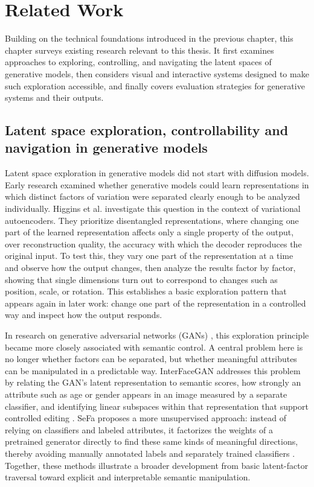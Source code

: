 \chapter{Related Work}\label{ch:related-work}

Building on the technical foundations introduced in the previous chapter, this chapter surveys existing research relevant to this thesis. It first examines approaches to exploring, controlling, and navigating the latent spaces of generative models, then considers visual and interactive systems designed to make such exploration accessible, and finally covers evaluation strategies for generative systems and their outputs.

\section{Latent space exploration, controllability and navigation in generative models}\label{sec:3.1}

Latent space exploration in generative models did not start with diffusion models. Early research examined whether generative models could learn representations in which distinct factors of variation were separated clearly enough to be analyzed individually. Higgins et al. investigate this question in the context of variational autoencoders. They prioritize disentangled representations, where changing one part of the learned representation affects only a single property of the output, over reconstruction quality, the accuracy with which the decoder reproduces the original input. To test this, they vary one part of the representation at a time and observe how the output changes, then analyze the results factor by factor, showing that single dimensions turn out to correspond to changes such as position, scale, or rotation. \cite{higgins2016early}
This establishes a basic exploration pattern that appears again in later work: change one part of the representation in a controlled way and inspect how the output responds.

In research on generative adversarial networks (GANs) \cite{goodfellow2014gan}, this exploration principle became more closely associated with semantic control. A central problem here is no longer whether factors can be separated, but whether meaningful attributes can be manipulated in a predictable way. InterFaceGAN addresses this problem by relating the GAN's latent representation to semantic scores, how strongly an attribute such as age or gender appears in an image measured by a separate classifier, and identifying linear subspaces within that representation that support controlled editing \cite{shen2020interfacegan}. SeFa proposes a more unsupervised approach: instead of relying on classifiers and labeled attributes, it factorizes the weights of a pretrained generator directly to find these same kinds of meaningful directions, thereby avoiding manually annotated labels and separately trained classifiers \cite{shen2021closedform}. Together, these methods illustrate a broader development from basic latent-factor traversal toward explicit and interpretable semantic manipulation.

